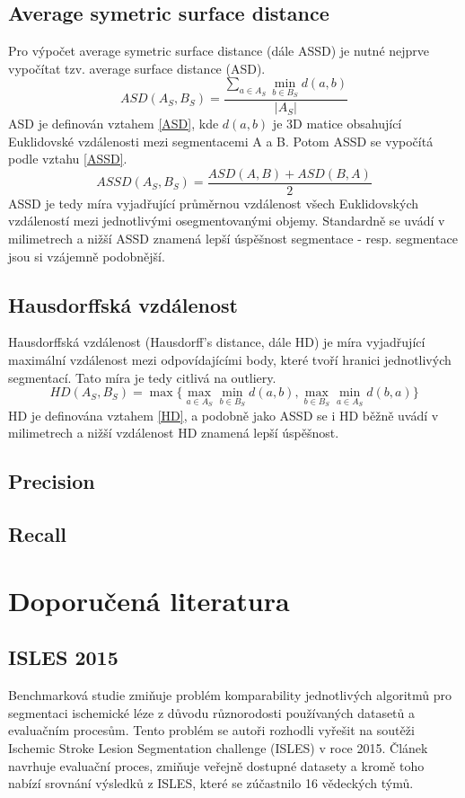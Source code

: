 \documentclass[11pt]{article}
\begin{document}
\subsection{Average symetric surface distance}
Pro výpočet average symetric surface distance (dále ASSD) je nutné nejprve vypočítat tzv. average surface distance (ASD).
\begin{equation}
	\label{ASD}
	ASD(A_S, B_S) = \frac{\sum_{a \in A_S} \min_{b \in B_S} d(a,b)}{|A_S|}
\end{equation}
ASD je definován vztahem \ref{ASD}, kde $d(a,b)$ je 3D matice obsahující Euklidovské vzdálenosti mezi segmentacemi A a B. Potom ASSD se vypočítá podle vztahu \ref{ASSD}.
\begin{equation}
	\label{ASSD}
	ASSD(A_S, B_S) = \frac{ASD(A, B) + ASD(B, A)}{2}
\end{equation}
ASSD je tedy míra vyjadřující průměrnou vzdálenost všech Euklidovských vzdáleností mezi jednotlivými osegmentovanými objemy. Standardně se uvádí v milimetrech a nižší ASSD znamená lepší úspěšnost segmentace - resp. segmentace jsou si vzájemně podobnější.

\subsection{Hausdorffská vzdálenost}
Hausdorffská vzdálenost (Hausdorff's distance, dále HD) je míra vyjadřující maximální vzdálenost mezi odpovídajícími body, které tvoří hranici jednotlivých segmentací. Tato míra je tedy citlivá na \alert{outliery}.
\begin{equation}
	\label{HD}
	HD(A_S, B_S) = \max \{\max_{a \in A_S}\min_{b \in B_S} d(a,b), \max_{b \in B_S}\min_{a \in A_S} d(b,a)\}
\end{equation}
HD je definována vztahem \ref{HD}, a podobně jako ASSD se i HD běžně uvádí v milimetrech a nižší vzdálenost HD znamená lepší úspěšnost.

\subsection{Precision}
\subsection{Recall}

\section{Doporučená literatura}
\subsection{ISLES 2015}
Benchmarková studie \cite{Maier2016} zmiňuje problém komparability jednotlivých algoritmů pro segmentaci ischemické léze z důvodu různorodosti používaných datasetů a evaluačním procesům. Tento problém se autoři rozhodli vyřešit na soutěži Ischemic Stroke Lesion Segmentation challenge (ISLES) v roce 2015. Článek navrhuje evaluační proces, zmiňuje veřejně dostupné datasety a kromě toho nabízí srovnání výsledků z ISLES, které se zúčastnilo 16 vědeckých týmů.
\end{document}
